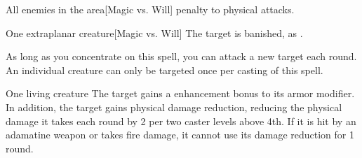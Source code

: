 \begin{comment}
\subsubsection{B}
\end{comment}

\begin{spelltargets}{All enemies in the area}[Magic vs. Will]
    \spellsuccess {} penalty to physical attacks.
\end{spelltargets}

\spellrng{\rngmed}
\begin{spelltargets}{One extraplanar creature}[Magic vs. Will]
    \spellsuccess The target is banished, as .
\end{spelltargets}
\spelleffect As long as you concentrate on this spell, you can attack a new target each round. An individual creature can only be targeted once per casting of this spell.

\spelldur{\durshort}
\begin{spelltarget}{One living creature}
    \spelleffect The target gains a  enhancement bonus to its armor modifier. \spellbonusscalingdescription In addition, the target gains physical damage reduction, reducing the physical damage it takes each round by 2  per two caster levels above 4th. If it is hit by an adamatine weapon or takes fire damage, it cannot use its damage reduction for 1 round.
\end{spelltarget}

